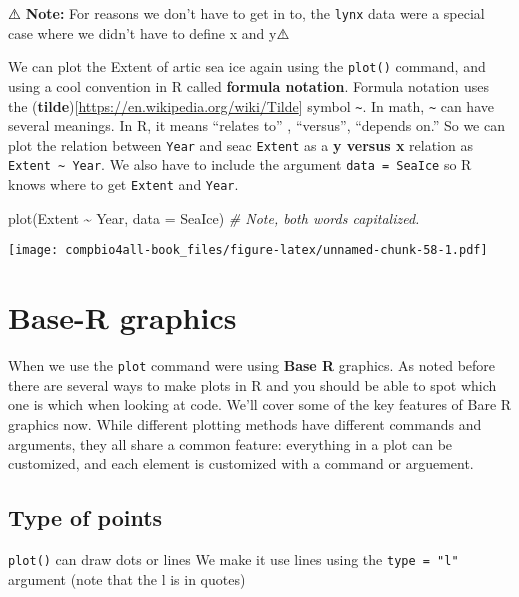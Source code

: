 \documentclass[
]{book}
\newenvironment{Shaded}{\begin{snugshade}}{\end{snugshade}}
\newcommand{\AttributeTok}[1]{\textcolor[rgb]{0.77,0.63,0.00}{#1}}
\newcommand{\CommentTok}[1]{\textcolor[rgb]{0.56,0.35,0.01}{\textit{#1}}}
\newcommand{\FunctionTok}[1]{\textcolor[rgb]{0.00,0.00,0.00}{#1}}
\newcommand{\NormalTok}[1]{#1}
\newcommand{\SpecialCharTok}[1]{\textcolor[rgb]{0.00,0.00,0.00}{#1}}
\begin{document}
⚠️ \textbf{Note:} For reasons we don't have to get in to, the \texttt{lynx} data were a special case where we didn't have to define x and y⚠️

We can plot the Extent of artic sea ice again using the \texttt{plot()} command, and using a cool convention in R called \textbf{formula notation}. Formula notation uses the (\textbf{tilde}){[}\url{https://en.wikipedia.org/wiki/Tilde}{]} symbol \texttt{\textasciitilde{}}. In math, \texttt{\textasciitilde{}} can have several meanings. In R, it means ``relates to'' , ``versus'', ``depends on.'' So we can plot the relation between \texttt{Year} and seac \texttt{Extent} as a \textbf{y versus x} relation as \texttt{Extent\ \textasciitilde{}\ Year}. We also have to include the argument \texttt{data\ =\ SeaIce} so R knows where to get \texttt{Extent} and \texttt{Year}.

\begin{Shaded}
\begin{Highlighting}[]
\FunctionTok{plot}\NormalTok{(Extent }\SpecialCharTok{\textasciitilde{}}\NormalTok{ Year, }\AttributeTok{data =}\NormalTok{ SeaIce)  }\CommentTok{\# Note, both words capitalized.}
\end{Highlighting}
\end{Shaded}

\texttt{[image: compbio4all-book\_files/figure-latex/unnamed-chunk-58-1.pdf]}

\hypertarget{base-r-graphics}{%
\section{Base-R graphics}\label{base-r-graphics}}

When we use the \texttt{plot} command were using \textbf{Base R} graphics. As noted before there are several ways to make plots in R and you should be able to spot which one is which when looking at code. We'll cover some of the key features of Bare R graphics now. While different plotting methods have different commands and arguments, they all share a common feature: everything in a plot can be customized, and each element is customized with a command or arguement.

\hypertarget{type-of-points}{%
\subsection{Type of points}\label{type-of-points}}

\texttt{plot()} can draw dots or lines We make it use lines using the \texttt{type\ =\ "l"} argument (note that the l is in quotes)
\end{document}
